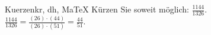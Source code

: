\begin{MAufgabe}{Kuerzen}{kr, dh, MaTeX}
K\"urzen Sie soweit m\"oglich: $\frac{1144}{1326}$.\\ 
\ifLsg\MLoesung
\quad $\frac{1144}{1326}=\frac{(26)\cdot(44)}{(26)\cdot(51)}=\frac{44}{51}$.\else\relax\fi
 \end{MAufgabe}